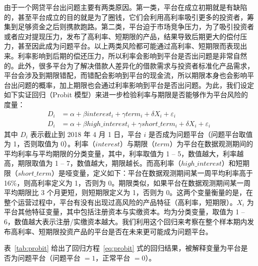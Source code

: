 \documentclass[lang=cn,11pt]{elegantpaper}
\begin{document}
由于一个网贷平台出问题主要有两类原因。第一类，平台在成立初期就是有缺陷的，甚至平台成立的目的就是为了圈钱，它们会利用高利率吸引更多的投资者，筹集到足够资金之后则携款跑路。第二类，平台迫于市场竞争压力，为了吸引投资者或者应对提现压力，发布了高利率、短期限的产品，结果导致后期更大的偿付压力，甚至因此成为问题平台。以上两类风险都可能通过高利率、短期限而表现出来。利率影响到后期的偿还压力，所以利率会影响到平台是否出问题是非常自然的。此外，很多平台为了解决借款人差异化的借款需求与投资者标准化产品需求，平台会涉及到期限错配，而错配会影响到平台的现金流，所以期限本身也会影响平台出问题的概率，加上期限也会通过利率影响到平台是否出问题。为此，我们设定如下实证回归（Probit 模型）来进一步检验利率与期限是否能够作为平台风险的度量：
\begin{equation}\label{eq:probit}
\begin{split}
      D_i & = \alpha + \beta interest_i + \gamma term_i + \delta X_i + \varepsilon_i \\
      D_i & = \alpha + \beta high\_interest_i + \gamma short\_term_i + \delta X_i + \varepsilon_i
\end{split}   
\end{equation}
其中 $D_i$ 表示截止到 2018 年 4 月 1 日，平台 $i$ 是否成为问题平台（问题平台取值为 1，否则取值为 0）。利率（$interest$）与期限（$term$）为平台在数据观测期间的平均利率与平均期限的分类变量，其中，利率取值为 1 -- 5，数值越大，利率越高，期限取值为 1 -- 7，数值越大，期限越长。而高利率（$high\_interest$）和短期限（$short\_term$）是哑变量，定义如下：平台在数据观测期间某一周平均利率高于 16\%，则高利率定义为 1，否则为 0。期限类似，如果平台在数据观测期间某一周平均期限比 3 个月更短，则短期限定义为 1，否则为 0。这两个变量衡量的是，在整个运营过程中，平台有没有出现过高风险的产品特征（高利率，短期限）。$X_i$ 为平台其他特征变量，其中包括注册资本与实缴资本。均为分类变量，取值为 1 -- 6，数值越大表示注册/实缴资本越大。我们利用这个回归来考察在整个样本期内发布高利率、短期限投资产品的平台是否在未来更可能成为问题平台。

表~\ref{tab:probit} 给出了回归方程~\eqref{eq:probit} 式的回归结果，被解释变量为平台是否为问题平台（问题平台 $=1$，正常平台 $=0$）。
\end{document}
